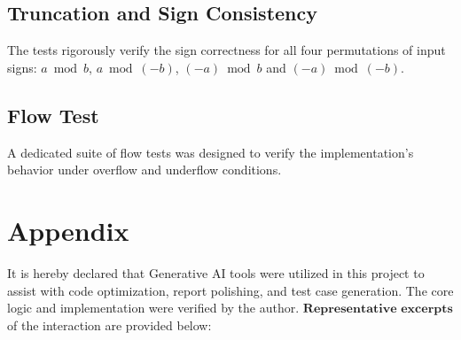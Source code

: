 \documentclass[11pt]{article}
\begin{document}
\subsection{Truncation and Sign Consistency}
The tests rigorously verify the sign correctness for all four permutations of input signs: $a \bmod b$, $a \bmod (-b)$, $(-a) \bmod b$ and $(-a) \bmod (-b)$.

\subsection{Flow Test}
A dedicated suite of flow tests was designed to verify the implementation's behavior under overflow and underflow conditions.
\newpage
\section{Appendix}
It is hereby declared that Generative AI tools were utilized in this project to assist with code optimization, report polishing, and test case generation. The core logic and implementation were verified by the author. $\textbf{Representative excerpts}$ of the interaction are provided below:

\end{document}
